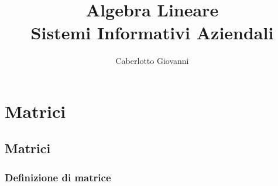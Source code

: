 \documentclass{report}
\title{\Huge{Algebra Lineare}\\Sistemi Informativi Aziendali}
\author{\huge{Caberlotto Giovanni}}
\date{}
\begin{document}
\maketitle
\newpage%
\tableofcontents
\pagebreak

\chapter{Matrici} %
\label{chap:Matrici}

\section{Matrici}

\subsection{Definizione di matrice}
\end{document}
